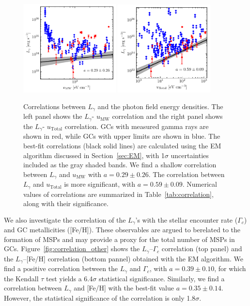 \documentclass[doublespace,nopageskip]{VTthesis} %
\begin{document}
\begin{figure}[htb]
    \centering
    \includegraphics[width=0.45\textwidth]{Figures/Globular/correlation/L_gamma_vs_isrf_urad.pdf}
    \includegraphics[width=0.45\textwidth]{Figures/Globular/correlation/L_gamma_vs_total_urad.pdf}
    \caption{\label{fig:correlation_urad} Correlations between $L_\gamma$ and the photon field energy densities. The left panel shows the $L_\gamma$- $u_\mathrm{MW}$ correlation and the right panel shows the $L_\gamma$- $u_\mathrm{Total}$ correlation. GCs with measured gamma rays are shown in red, while GCs with upper limits are shown in blue. The best-fit correlations (black solid lines) are calculated using the EM algorithm discussed in Section~\ref{sec:EM}, with 1$\sigma$ uncertainties included as the gray shaded bands. We find a shallow correlation between $L_\gamma$ and $u_\mathrm{MW}$ with $a = 0.29 \pm 0.26$. The correlation between $L_\gamma$ and $u_\mathrm{Total}$ is more significant, with $a = 0.59 \pm 0.09$. Numerical values of correlations are summarized in Table~\ref{tab:correlation}, along with their significance.
    }
\end{figure}

We also investigate the correlation of the $L_\gamma$'s with the stellar encounter rate ($\Gamma_c$) and GC metallicities ([Fe/H]). These observables are argued to berelated to the formation of MSPs and may provide a proxy for the total number of MSPs in GCs. Figure~\ref{fig:correlation_other} shows the $L_\gamma$--$\Gamma_c$ correlation (top panel) and the $L_\gamma$--[Fe/H] correlation (bottom pannel) obtained with the EM algorithm. We find a positive correlation between the $L_\gamma$ and $\Gamma_c$, with $a = 0.39 \pm 0.10$, for which the Kendall $\tau$ test yields a 6.4$\sigma$ statistical significance. Similarly, we find a correlation between $L_\gamma$ and [Fe/H] with the best-fit value $a = 0.35 \pm 0.14$. However, the statistical significance of the correlation is only 1.8$\sigma$. 
\end{document}
